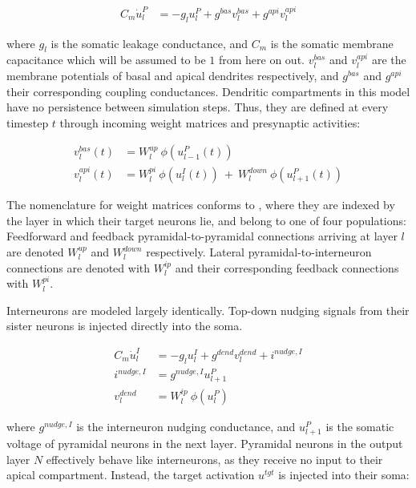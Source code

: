 \begin{align}
  C_m \dot{u}_l^P & = - g_l u_l^{P} + g^{bas} v_l^{bas} + g^{api} v_l^{api} \label{eq-pyr-dynamics-rate}
\end{align}

where $g_l$ is the somatic leakage conductance, and $C_m$ is the somatic membrane capacitance which will be assumed to
be $1$ from here on out. $v_l^{bas}$ and $v_l^{api}$ are the membrane potentials of basal and apical dendrites
respectively, and $g^{bas}$ and $g^{api}$ their corresponding coupling conductances.  Dendritic compartments in this
model have no persistence between simulation steps. Thus, they are defined at every timestep $t$ through incoming weight
matrices and presynaptic activities:

\begin{align}
  v_l^{bas}(t) & = W_l^{up} \ \phi(u_{l-1}^P(t)) \label{eq-v-bas-rate}                                     \\
  v_l^{api}(t) & =  W_l^{pi} \ \phi(u_l^I(t)) \ + \  W_l^{down} \ \phi(u_{l+1}^P(t)) \label{eq-v-api-rate}
\end{align}

The nomenclature for weight matrices conforms to \citep{Haider2021}, where they are indexed by the layer in which their
target neurons lie, and belong to one of four populations: Feedforward and feedback pyramidal-to-pyramidal connections
arriving at layer $l$ are denoted $W_l^{up}$ and $W_l^{down}$ respectively. Lateral pyramidal-to-interneuron connections
are denoted with $W_l^{ip}$ and their corresponding feedback connections with $W_l^{pi}$.

Interneurons are modeled largely identically. Top-down nudging signals from their sister neurons is injected directly
into the soma.

\begin{align}
  C_m \dot{u}_l^I & = - g_l u_l^{I} + g^{dend} v_l^{dend} + i^{nudge, I}\label{eq-intn-dynamics} \\
  i^{nudge, I}    & = g^{nudge, I} u_{l+1}^P                                                     \\
  v_l^{dend}      & = W_l^{ip} \ \phi(u_{l}^P)
\end{align}

where $ g^{nudge, I}$ is the interneuron nudging conductance, and $u_{l+1}^P$ is the somatic voltage of pyramidal
neurons in the next layer.  Pyramidal neurons in the output layer $N$ effectively behave like interneurons, as they
receive no input to their apical compartment. Instead, the target  activation $u^{tgt}$ is injected into their soma:

